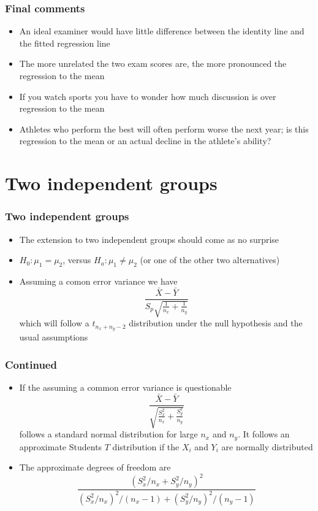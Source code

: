 \documentclass[aspectratio=169]{beamer}
\begin{document}
\begin{frame}\frametitle{Final comments}
  \begin{itemize}
     \item An ideal examiner would have little difference between the identity line
       and the fitted regression line
     \item The more unrelated the two exam scores are, the more pronounced the regression to the mean
     \item If you watch sports you have to wonder how much discussion
       is over regression to the mean
     \item Athletes who perform the best will often perform worse the
       next year; is this regression to the mean or an actual decline
       in the athlete's ability?
  \end{itemize}
  
\end{frame}

\section{Two independent groups}
\begin{frame}\frametitle{Two independent groups}
\begin{itemize}
\item The extension to two independent groups should come as no surprise
\item $H_0:\mu_1 = \mu_2$, versus $H_a:\mu_1 \neq \mu_2$ (or one of the other
  two alternatives)
\item Assuming a comon error variance we have
  $$
  \frac{\bar X - \bar Y}{S_p \sqrt{\frac{1}{n_x} +
      \frac{1}{n_y}}}
  $$
  which will follow a $t_{n_x + n_y - 2}$ distribution under the null
  hypothesis and the usual assumptions
\end{itemize}
\end{frame}

\begin{frame}\frametitle{Continued}
\begin{itemize}
\item If the assuming a common error variance is questionable
$$
  \frac{\bar X - \bar Y}{\sqrt{\frac{S_x^2}{n_x} + \frac{S_y^2}{n_y}}}
  $$
  follows a standard normal distribution for large $n_x$ and $n_y$.
  It follows an approximate Students $T$ distribution if the $X_i$ and
  $Y_i$ are normally distributed 
\item The approximate degrees of freedom are
  $$
  \frac{(S_x^2 / n_x + S_y^2 / n_y)^2}{(S_x^2 / n_x)^2 / (n_x - 1) + (S_y^2 / n_y)^2 / (n_y - 1)}
  $$
\end{itemize}
\end{frame}
\end{document}
